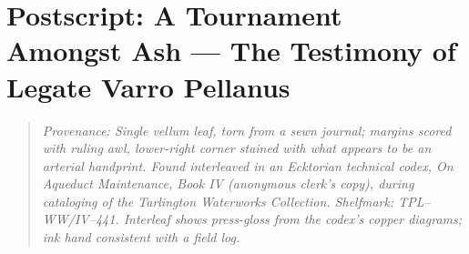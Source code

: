 \documentclass[11pt]{article}
\begin{document}
\clearpage
\section*{Postscript: A Tournament Amongst Ash — The Testimony of Legate Varro Pellanus}
\label{sec:postscript}
{}

\begin{quote}\footnotesize\itshape
Provenance: Single vellum leaf, torn from a sewn journal; margins scored with ruling awl, lower-right corner stained with what appears to be an arterial handprint. Found interleaved in an Ecktorian technical codex, \emph{On Aqueduct Maintenance, Book IV} (anonymous clerk’s copy), during cataloging of the Tarlington Waterworks Collection. Shelfmark: TPL–WW/IV–441. Interleaf shows press-gloss from the codex’s copper diagrams; ink hand consistent with a field log.
\end{quote}
\end{document}

